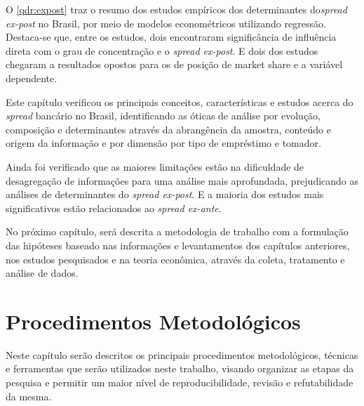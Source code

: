 \documentclass[
  12pt,
  12pt,
  openright,
  oneside,
  a4paper,
  chapter=TITLE,
  section=TITLE,
  subsection=TITLE,
  subsubsection=TITLE,
  english,
  portugues,
  sumario=tradicional]{abntex2}
\begin{document}
O \autoref{qdr:expost} traz o resumo dos estudos empíricos dos determinantes do\emph{spread ex-post} no Brasil, por meio de modelos econométricos utilizando regressão. Destaca-se que, entre os estudos, dois encontraram significância de influência direta com o grau de concentração e o \emph{spread ex-post}. E dois dos estudos chegaram a resultados opostos para os de posição de market share e a variável dependente.

Este capítulo verificou os principais conceitos, características e estudos acerca do \emph{spread} bancário no Brasil, identificando as óticas de análise por evolução, composição e determinantes através da abrangência da amostra, conteúdo e origem da informação e por dimensão por tipo de empréstimo e tomador.

Ainda foi verificado que as maiores limitações estão na dificuldade de desagregação de informações para uma análise mais aprofundada, prejudicando as análises de determinantes do \emph{spread ex-post}. E a maioria dos estudos mais significativos estão relacionados ao \emph{spread ex-ante}.

No próximo capítulo, será descrita a metodologia de trabalho com a formulação das hipóteses baseado nas informações e levantamentos dos capítulos anteriores, nos estudos pesquisados e na teoria econômica, através da coleta, tratamento e análise de dados.

\textual
\pagestyle{simple}
\parindent 1.50cm

\chapter{Procedimentos Metodológicos}

Neste capítulo serão descritos os principais procedimentos metodológicos, técnicas e ferramentas que serão utilizados neste trabalho, visando organizar as etapas da pesquisa e permitir um maior nível de reproducibilidade, revisão e refutabilidade da mesma.
\end{document}
